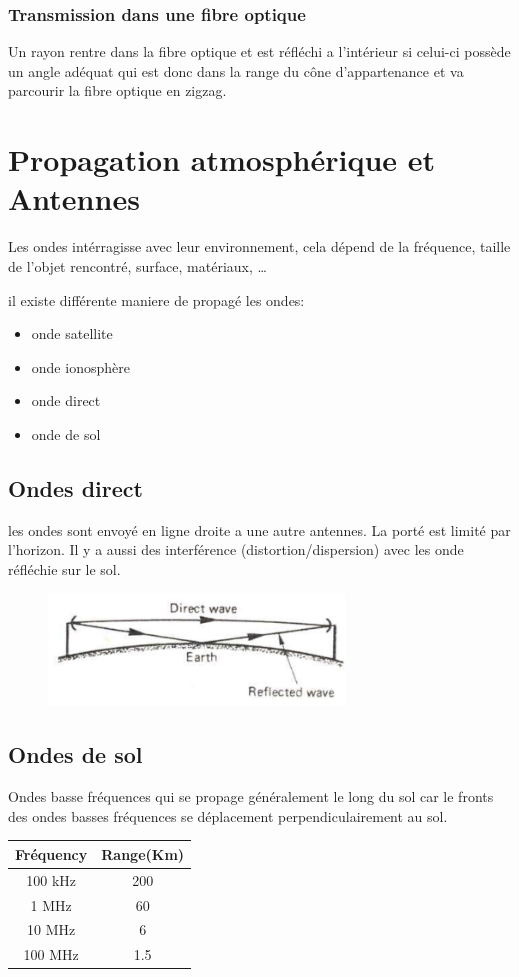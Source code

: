 \documentclass[12pt]{article}
\begin{document}
			\subsubsection{Transmission dans une fibre optique}
				Un rayon rentre dans la fibre optique et est réfléchi a l'intérieur si celui-ci possède un angle adéquat qui est donc dans la range du cône d'appartenance et va parcourir la fibre optique en zigzag.
				
			
\section{Propagation atmosphérique et Antennes}
	Les ondes intérragisse avec leur environnement, cela dépend de la fréquence, taille de l'objet rencontré, surface, matériaux, \dots
	
	il existe différente maniere de propagé les ondes:
	\begin{itemize}
		\item onde satellite
		\item onde ionosphère
		\item onde direct
		\item onde de sol
	\end{itemize}
	
	
	\subsection{Ondes direct}
		les ondes sont envoyé en ligne droite a une autre antennes. La porté est limité par l'horizon. Il y a aussi des interférence (distortion/dispersion) avec les onde réfléchie sur le sol.
		
		\begin{figure}[htp]
			\centering
			\includegraphics[width=0.7\textwidth]{img/onde_direct.png}
		\end{figure}
	
	\subsection{Ondes de sol}
		Ondes basse fréquences qui se propage généralement le long du sol car le fronts des ondes basses fréquences se déplacement perpendiculairement au sol.
		\begin{center}
			\begin{tabular}{c|c}
			\hline
			Fréquency & Range(Km)\\
			\hline
			100 kHz & 200\\
			1 MHz & 60\\
			10 MHz & 6\\
			100 MHz & 1.5\\
			\hline
		
		\end{tabular}
		\end{center}
		
\end{document}
